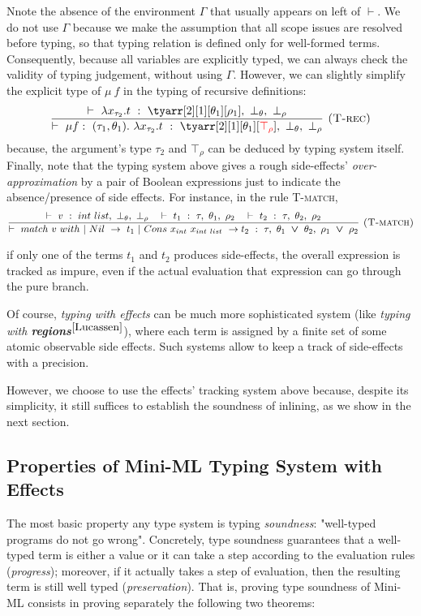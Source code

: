 \documentclass[a4paper,11pt,oneside]{article}
\theoremstyle{plain}
\newcommand{\bvee}{\boldsymbol{~\vee~}}
\newcommand{\typing}[4]{\vdash~#1~:~#2,~#3,~#4}
\newcommand{\bth}{\bot_\theta}
\newcommand{\brh}{\bot_\rho}
\newcommand{\trh}{\top_\rho}
\begin{document}
	Nnote the absence of the environment $\Gamma$ that usually appears on left of $\vdash$. We do not use $\Gamma$ because we make the assumption that all scope issues are resolved before typing, so that typing relation is defined only for well-formed terms. 
	 Consequently, because all variables are explicitly typed, we can always check the validity of typing judgement, without using $\Gamma$. 
	 However, we can slightly simplify the explicit type of $\mu~f$ in the typing of recursive definitions:
$$\dfrac 
	{\typing{\lambda x_{\tau_2}. t}{\tyarr[2][1][\theta_1][\rho_1]}{\bth}{\brh}}
	{\typing{\mu f:~(\tau_1, \theta_1) .~
		\lambda x_{\tau_2}. t}
		{\tyarr[2][1][\theta_1][\textcolor{red}{\trh}]}
			{\bth}{\brh}}
	{\textsc{  (T-rec)}}$$
because, the argument's type $\tau_2$ and $\top_{\rho}$ can be deduced by typing system itself. \\

	Finally, note that the typing system above gives a rough side-effects' \textit{over-approximation} by a pair of Boolean expressions just to indicate the absence/presence of side effects. 
	For instance, in the rule \textsc{T-match}, 
$$\dfrac
	{\typing{v}{int~list}{\bth}{\brh} \quad
	 \typing{t_1}{\tau}{\theta_1}{\rho_2}  \quad
	 \typing{t_2}{\tau}{\theta_2}{\rho_2}  }
	{\typing{match~v~with ~|~Nil~->~t_1~|~Cons~x_{int}~x_{int~list}~->t_2}{\tau}{\theta_1 \bvee \theta_2}
		{\rho_1 \bvee \rho_2}} 
{\textsc{  (T-match)}}$$
	
	if only one of the terms $t_1$ and $t_2$ produces side-effects, the overall expression is tracked as impure, even if the actual evaluation that expression can go through the pure branch.
	
	Of course, \textit{typing with effects} can be much more sophisticated system (like  \textit{typing with \textbf{regions}}$^{\cite{Lucassen}}$), where each term is assigned by a finite set of some atomic observable side effects. 
	Such systems allow to keep a track of side-effects with a precision.	
		
	However, we choose to use the effects' tracking system above because, despite its simplicity, it still suffices to establish the soundness of inlining, as we show in the next section. 
		
\subsection{Properties of Mini-ML Typing System with Effects}	

	The most basic property	any type system is typing \textit{soundness}: "well-typed programs do not go wrong". 
	Concretely, type soundness guarantees that a well-typed term is either a value or it can take a step according to the evaluation rules (\textit{progress}); moreover, if it actually takes a step of evaluation, then the resulting term is still well typed (\textit{preservation}).
	That is, proving type soundness of Mini-ML consists in proving separately the following two theorems:
	
\end{document}
